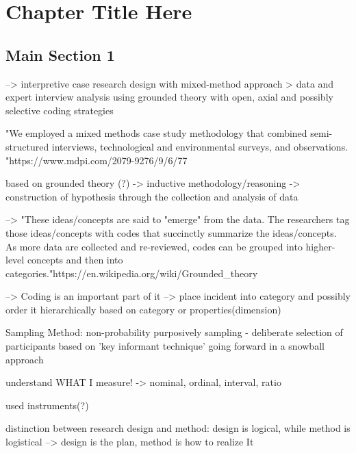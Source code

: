 
\chapter{Chapter Title Here} %

\label{ChapterX} %


\section{Main Section 1}

--> interpretive case research design with mixed-method approach > data and expert interview analysis using grounded theory with open, axial and possibly selective coding strategies

"We employed a mixed methods case study methodology that combined semi-structured interviews, technological and environmental surveys, and observations. "https://www.mdpi.com/2079-9276/9/6/77


based on grounded theory (?) -> inductive methodology/reasoning -> construction of hypothesis through the collection and analysis of data


--> "These ideas/concepts are said to "emerge" from the data. The researchers tag those ideas/concepts with codes that succinctly summarize the ideas/concepts. As more data are collected and re-reviewed, codes can be grouped into higher-level concepts and then into categories."https://en.wikipedia.org/wiki/Grounded_theory

--> Coding is an important part of it --> place incident into category and possibly order it hierarchically based on category or properties(dimension)

Sampling Method:
non-probability purposively sampling - deliberate selection of participants based on 'key informant technique' going forward in a snowball approach

understand WHAT I measure!
-> nominal, ordinal, interval, ratio

used instruments(?)


distinction between research design and method:
design is logical, while method is logistical
--> design is the plan, method is how to realize It

